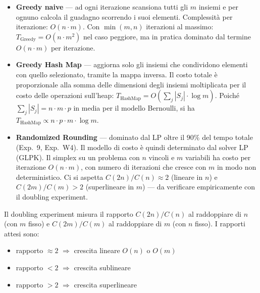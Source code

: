 \documentclass[12pt, a4paper]{article}
\begin{document}
\begin{itemize}
    \item \textbf{Greedy naive} — ad ogni iterazione scansiona 
    tutti gli $m$ insiemi e per ognuno calcola il guadagno 
    scorrendo i suoi elementi. Complessit\`a per iterazione: 
    $O(n \cdot m)$. Con $\min(m,n)$ iterazioni al massimo: 
    $T_{\text{Greedy}} = O(n \cdot m^2)$ nel caso peggiore, 
    ma in pratica dominato dal termine $O(n \cdot m)$ 
    per iterazione.

    \item \textbf{Greedy Hash Map} — aggiorna solo gli insiemi 
    che condividono elementi con quello selezionato, 
    tramite la mappa inversa. Il costo totale \`e proporzionale 
    alla somma delle dimensioni degli insiemi moltiplicata 
    per il costo delle operazioni sull'heap:
    $T_{\text{HashMap}} = O\!\left(\sum_j|S_j| \cdot \log m\right)$.
    Poich\'e $\sum_j|S_j| = n \cdot m \cdot p$ in media 
    per il modello Bernoulli, si ha 
    $T_{\text{HashMap}} \propto n \cdot p \cdot m \cdot \log m$.

    \item \textbf{Randomized Rounding} — dominato dal LP oltre il $90\%$ 
    del tempo totale (Exp.~9, Exp.~W4). 
    Il modello di costo \`e quindi determinato dal solver LP (GLPK). 
    Il simplex su un problema con $n$ vincoli e $m$ variabili 
    ha costo per iterazione $O(n \cdot m)$, con numero di iterazioni 
    che cresce con $m$ in modo non deterministico. 
    Ci si aspetta $C(2n)/C(n) \approx 2$ (lineare in $n$) 
    e $C(2m)/C(m) > 2$ (superlineare in $m$) — 
    da verificare empiricamente con il doubling experiment.
\end{itemize}

    Il doubling experiment misura il rapporto $C(2n)/C(n)$ al raddoppiare 
    di $n$ (con $m$ fisso) e $C(2m)/C(m)$ al raddoppiare di $m$ 
    (con $n$ fisso). I rapporti attesi sono:

\begin{itemize}
    \item rapporto $\approx 2$ $\Rightarrow$ crescita lineare $O(n)$ o $O(m)$
    \item rapporto $< 2$ $\Rightarrow$ crescita sublineare
    \item rapporto $> 2$ $\Rightarrow$ crescita superlineare
\end{itemize}
\end{document}
